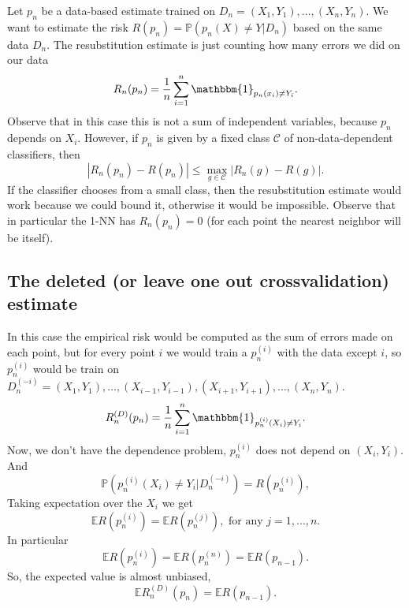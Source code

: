\documentclass[11pt, english]{article}
\begin{document}
Let $p_n$ be a data-based estimate trained on $D_n=(X_1,Y_1),\dots,(X_n,Y_n)$. We want to estimate the risk $R(p_n)=\mathbb{P}(p_n(X)\neq Y|D_n)$ based on the same data $D_n$. The resubstitution estimate is just counting how many errors we did on our data
\begin{equation}
	R_n(p_n)=\frac{1}{n}\sum\limits_{i=1}^n\mathbbm{1}_{p_n(x_i)\neq Y_i}.
\end{equation}
Observe that in this case this is not a sum of independent variables, because $p_n$ depends on $X_i$. However, if $p_n$ is given by a fixed class $\mathcal{C}$ of non-data-dependent classifiers, then 
\begin{equation}
	|R_n(p_n)-R(p_n)|\leq\underset{g\in\mathcal{C}}{\max}|R_n(g)-R(g)|.
\end{equation}
If the classifier chooses from a small class, then the resubstitution estimate would work because we could bound it, otherwise it would be impossible. Observe that in particular the 1-NN has $R_n(p_n)=0$ (for each point the nearest neighbor will be itself).

\subsection{The deleted (or leave one out crossvalidation) estimate}

In this case the empirical risk would be computed as the sum of errors made on each point, but for every point $i$ we would train a $p_n^{(i)}$ with the data except $i$, so $p_n^{(i)}$ would be train on $D_n^{(-i)}=(X_1,Y_1),\dots,(X_{i-1},Y_{i-1}), (X_{i+1},Y_{i+1}),\dots,(X_n,Y_n)$.
\begin{equation}
	R_n^{(D)}(p_n)=\frac{1}{n}\sum\limits_{i=1}^n\mathbbm{1}
_{p_n^{(i)}(X_i)\neq Y_i}.
\end{equation}
Now, we don't have the dependence problem, $p_n^{(i)}$ does not depend on $(X_i,Y_i)$. And
\begin{equation}
	\mathbb{P}(p_n^{(i)}(X_i)\neq Y_i|D_n^{(-i)})=R(p_n^{(i)}),
\end{equation}
Taking expectation over the $X_i$ we get
\begin{equation}
	\mathbb{E}R(p_n^{(i)})=\mathbb{E}R(p_n^{(j)}),\text{ for any }j=1,\dots,n.
\end{equation}
In particular 
\begin{equation}
	\mathbb{E}R(p_n^{(i)})=\mathbb{E}R(p_n^{(n)})=\mathbb{E}R(p_{n-1}).
\end{equation}
So, the expected value is almost unbiased, 
\begin{equation}
	\mathbb{E}R_n^{(D)}(p_n)=\mathbb{E}R(p_{n-1}).
\end{equation}
\end{document}
